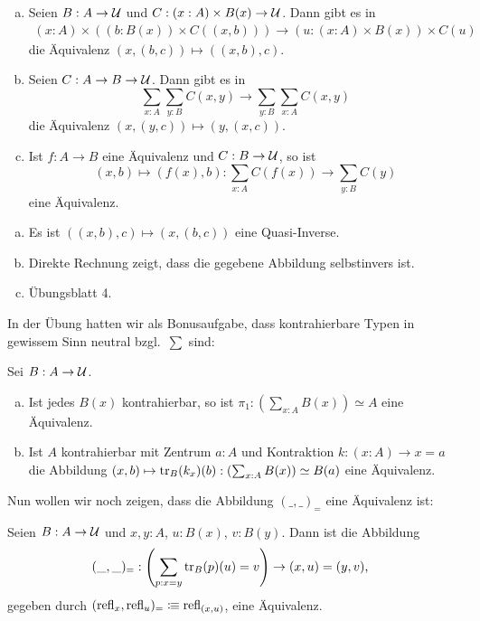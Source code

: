 \begin{lemma}
  \begin{enumerate}[(a)]
  \item   Seien $B:A\to \mathcal{U}$ und $C:(x:A) \times B(x)\to \mathcal{U}$. Dann gibt es in
  \begin{align*}
     (x:A)\times ((b:B(x))\times C((x,b))) \to  (u:(x:A) \times B(x))\times C(u)
  \end{align*}
  die Äquivalenz $(x,(b,c))\mapsto ((x,b),c)$.
\item   Seien $C:A\to B\to \mathcal{U}$. Dann gibt es in
  \[
    \sum_{x:A}\sum_{y:B}C(x,y)\to \sum_{y:B}\sum_{x:A}C(x,y)
    \]
  die Äquivalenz $(x,(y,c))\mapsto (y,(x,c))$.
\item   Ist $f:A\to B$ eine Äquivalenz und $C:B\to\mathcal{U}$, so ist
  \[
     (x,b)\mapsto (f(x),b) : \sum_{x:A}C(f(x))\to \sum_{y:B}C(y)
  \]
  eine Äquivalenz.
  \end{enumerate}
\end{lemma}

\begin{beweis}
  \begin{enumerate}[(a)]
  \item   Es ist $((x,b),c)\mapsto (x,(b,c))$ eine Quasi-Inverse.
\item   Direkte Rechnung zeigt, dass die gegebene Abbildung selbstinvers ist.
\item Übungsblatt 4.
  \end{enumerate}
\end{beweis}

In der Übung hatten wir als Bonusaufgabe,
dass kontrahierbare Typen in gewissem Sinn neutral bzgl.\ $\sum$ sind:

\begin{lemma}
  Sei $B:A\to\mathcal{U}$.
  \begin{enumerate}[(a)]
  \item Ist jedes $B(x)$ kontrahierbar, so ist $\pi_1:\left(\sum_{x:A}B(x)\right)\simeq A$ eine Äquivalenz.
  \item Ist $A$ kontrahierbar mit Zentrum $a:A$ und Kontraktion $k:(x:A)\to x=a$ die Abbildung
    $(x,b)\mapsto \mathrm{tr}_B(k_x)(b) : \left(\sum_{x:A}B(x)\right)\simeq B(a)$ eine Äquivalenz.
  \end{enumerate}
\end{lemma}

Nun wollen wir noch zeigen, dass die Abbildung $(\_,\_)_=$ eine Äquivalenz ist:

\begin{lemma}
  \label{sigma-gleichheitstyp}
  Seien $B:A\to\mathcal{U}$ und $x,y:A$, $u:B(x)$, $v:B(y)$. Dann ist die Abbildung
  \begin{align*}
    &(\_,\_)_=:\left(\sum_{p:x=y}\transp_B(p)(u)=v\right) \to (x,u)=(y,v)\rlap{,}
  \end{align*}
  gegeben durch $(\mathrm{refl}_x,\mathrm{refl}_u)_=\vcentcolon\mspace{-1.2mu}\equiv \mathrm{refl}_{(x,u)}$, eine Äquivalenz.
\end{lemma}

